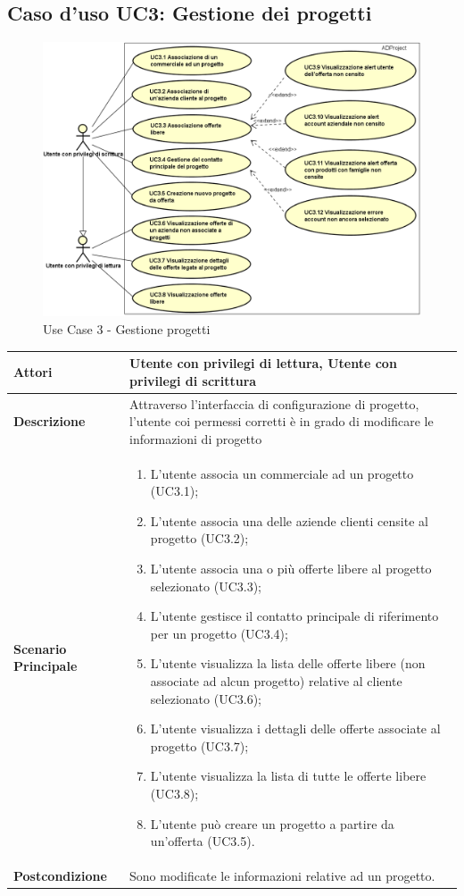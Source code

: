 	\subsection{Caso d'uso UC3: Gestione dei progetti}
	\begin{figure}[H]
		\centering
		\includegraphics[scale=0.55]{images/useCase/UC3}
		\caption{Use Case 3 - Gestione progetti}
		\label{fig:uc3}
	\end{figure}
	\begin{longtable}{ | p{2.7cm} | p{12cm} |}
		\hline \textbf{Attori} & Utente con privilegi di lettura, Utente con privilegi di scrittura\\ 
		\hline \textbf{Descrizione} & Attraverso l’interfaccia di configurazione di progetto, l’utente coi permessi corretti è in grado di modificare le informazioni di progetto \\ 
		\hline \textbf{Scenario Principale} & \begin{enumerate}
			\itemsep-0.5em 
			\item L’utente associa un commerciale ad un progetto  (UC3.1);
			\item L’utente associa una delle aziende clienti censite al progetto  (UC3.2);
			\item L’utente associa una o più offerte libere al progetto selezionato  (UC3.3);
			\item L’utente gestisce il contatto principale di riferimento per un progetto  (UC3.4);
			\item L’utente visualizza la lista delle offerte libere (non associate ad alcun progetto) relative al cliente selezionato  (UC3.6);
			\item L’utente visualizza i dettagli delle offerte associate al progetto  (UC3.7);
			\item L’utente visualizza la lista di tutte le offerte libere  (UC3.8);
			\item L’utente può creare un progetto a partire da un’offerta  (UC3.5).
			
		\end{enumerate}
		\\ 
		\hline \textbf{Postcondizione} & Sono modificate le informazioni relative ad un progetto. \\ 
		\hline 
	\end{longtable}
	
